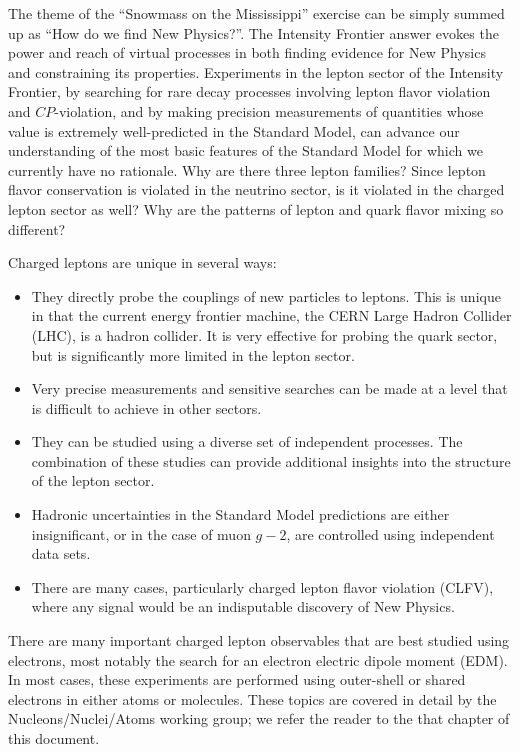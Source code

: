 The theme of the ``Snowmass on the Mississippi'' exercise can be simply summed up as ``How do we find New Physics?''. The Intensity Frontier answer evokes the power and reach of virtual processes in both finding evidence for New Physics and constraining its properties. Experiments in the lepton sector of the Intensity Frontier, by searching for rare decay processes involving lepton flavor violation and $C\!P$-violation, and by making precision measurements of quantities whose value is extremely well-predicted in the Standard Model, can advance our understanding of the most basic features of the Standard Model for which we currently have no rationale. Why are there three lepton families? Since lepton flavor conservation is violated in the neutrino sector, is it violated in the charged lepton sector as well? Why are the patterns of lepton and quark flavor mixing so different?

 Charged leptons are unique in several ways:
\begin{itemize}
\item
They directly probe the couplings of new particles to leptons.  This is unique in that the current energy frontier machine, the 
CERN Large Hadron Collider (LHC), is a hadron
collider. It is very effective for probing the quark sector, but
is significantly more limited in the lepton sector.
\item
Very
precise measurements  and sensitive searches can be made at a level that is difficult to achieve in
other sectors.
\item
They can be studied using a diverse set of independent
processes. The combination of these studies can provide additional
insights into the structure of the lepton sector.
\item
Hadronic uncertainties in the Standard Model predictions are either insignificant, or in the case of muon $g-2$, are controlled using independent data sets.
\item
There are  many cases, particularly charged lepton flavor violation (CLFV), where any signal would be an indisputable discovery of New Physics.
\end{itemize}

There are many important charged lepton observables that are best studied using electrons, most notably the search for an electron electric dipole moment (EDM).  In most cases, these experiments are performed using outer-shell or shared electrons in either atoms or molecules.  These topics are covered in detail by the Nucleons/Nuclei/Atoms working group; we refer the reader to the that chapter of this document.

